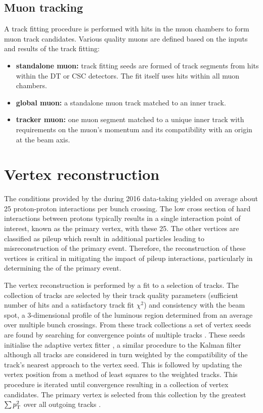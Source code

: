 \subsection{Muon tracking}\label{subsec:muon-tracking}

A track fitting procedure is performed with hits in the muon chambers to form muon track candidates. Various quality muons are defined based on the inputs and results of the track fitting:

\begin{itemize}
    \item \textbf{standalone muon:} track fitting seeds are formed of track segments from hits within the DT or CSC detectors. The fit itself uses hits within all muon chambers.
    \item \textbf{global muon:} a standalone muon track matched to an inner track.
    \item \textbf{tracker muon:} one muon segment matched to a unique inner track with requirements on the muon's momentum and its compatibility with an origin at the beam axis.
\end{itemize}


\section{Vertex reconstruction}\label{sec:vertex-reco}

The conditions provided by the \LHC during 2016 data-taking yielded on average about 25 proton-proton interactions per bunch crossing. The low cross section of hard interactions between protons typically results in a single interaction point of interest, known as the primary vertex, with these 25. The other vertices are classified as pileup which result in additional particles leading to misreconstruction of the primary event. Therefore, the reconstruction of these vertices is critical in mitigating the impact of pileup interactions, particularly in determining the \ptmiss of the primary event.

The vertex reconstruction is performed by a fit to a selection of tracks. The collection of tracks are selected by their track quality parameters (sufficient number of hits and a satisfactory track fit $\chi^2$) and consistency with the beam spot, a 3-dimensional profile of the luminous region determined from an average over multiple bunch crossings. From these track collections a set of vertex seeds are found by searching for convergence points of multiple tracks \cite{Speer:927395}. These seeds initialise the adaptive vertex fitter \cite{Fruhwirth:1027031}, a similar procedure to the Kalman filter although all tracks are considered in turn weighted by the compatibility of the track's nearest approach to the vertex seed. This is followed by updating the vertex position from a method of least squares to the weighted tracks. This procedure is iterated until convergence resulting in a collection of vertex candidates. The primary vertex is selected from this collection by the greatest $\sum p_{\text{T}}^2$ over all outgoing tracks \cite{Sirunyan:2017ulk}.


